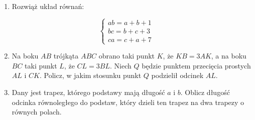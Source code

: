 \documentclass[10pt]{article}
\begin{document}
\begin{enumerate}
  \item Rozwiąż układ równań:
\end{enumerate}

\[
\left\{\begin{array}{l}
a b=a+b+1 \\
b c=b+c+3 \\
c a=c+a+7
\end{array}\right.
\]

\begin{enumerate}
  \setcounter{enumi}{1}
  \item Na boku \(A B\) trójkąta \(A B C\) obrano taki punkt \(K\), że \(K B=3 A K\), a na boku \(B C\) taki punkt \(L\), że \(C L=3 B L\). Niech \(Q\) będzie punktem przecięcia prostych \(A L\) i \(C K\). Policz, w jakim stosunku punkt \(Q\) podzielił odcinek \(A L\).
  \item Dany jest trapez, którego podstawy mają długość \(a\) i \(b\). Oblicz długość odcinka równoległego do podstaw, który dzieli ten trapez na dwa trapezy o równych polach.
\end{enumerate}
\end{document}
